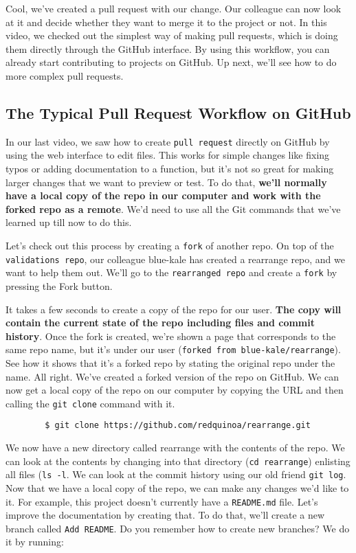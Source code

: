 	Cool, we've created a pull request with our change. Our colleague can now look at it and decide whether they want to merge it to the project or not. In this video, we checked out the simplest way of making pull requests, which is doing them directly through the GitHub interface. By using this workflow, you can already start contributing to projects on GitHub. Up next, we'll see how to do more complex pull requests.
	
	\subsection{The Typical Pull Request Workflow on GitHub}
	
	
	In our last video, we saw how to create \texttt{pull request} directly on GitHub by using the web interface to edit files. This works for simple changes like fixing typos or adding documentation to a function, but it's not so great for making larger changes that we want to preview or test. To do that,\textbf{ we'll normally have a local copy of the repo in our computer and work with the forked repo as a remote}. We'd need to use all the Git commands that we've learned up till now to do this. 
	
	Let's check out this process by creating a \texttt{fork} of another repo. On top of the \texttt{validations repo}, our colleague blue-kale has created a rearrange repo, and we want to help them out. We'll go to the \texttt{rearranged repo} and create a \texttt{fork} by pressing the Fork button.
	
	It takes a few seconds to create a copy of the repo for our user. \textbf{The copy will contain the current state of the repo including files and commit history}. Once the fork is created, we're shown a page that corresponds to the same repo name, but it's under our user (\texttt{forked from blue-kale/rearrange}). See how it shows that it's a forked repo by stating the original repo under the name. 
	All right. We've created a forked version of the repo on GitHub. We can now get a local copy of the repo on our computer by copying the URL and then calling the \texttt{git clone} command with it.
	
	\begin{verbatim}
		$ git clone https://github.com/redquinoa/rearrange.git		
	\end{verbatim}
	
	We now have a new directory called rearrange with the contents of the repo. We can look at the contents by changing into that directory (\texttt{cd rearrange}) enlisting all files (\verb|ls -l|. We can look at the commit history using our old friend \texttt{git log}. 
	Now that we have a local copy of the repo, we can make any changes we'd like to it. For example, this project doesn't currently have a \verb|README.md| file. Let's improve the documentation by creating that. To do that, we'll create a new branch called \texttt{Add README}. Do you remember how to create new branches? We do it by running:
	
